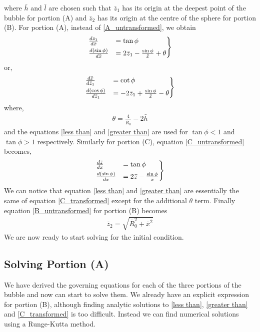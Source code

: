 where $\bar{h}$ and $\bar{l}$ are chosen such that $\bar{z}_1$ has its origin at the deepest point of the bubble for portion (A) and $\bar{z}_2$ has its origin at the centre of the sphere for portion (B). For portion (A), instead of \ref{A_untransformed}, we obtain
\begin{align}\label{less than}
\begin{rcases}   
    \frac{d\bar{z}_1}{d\bar{x}} &= \tan \phi \\
    \frac{d(\sin\phi)}{d\bar{x}} &= 2\bar{z}_1 - \frac{\sin\phi}{\bar{x}} + \theta
\end{rcases} 
\end{align}
or,
\begin{align}\label{greater than}
\begin{rcases}
    \frac{d\bar{x}}{d\bar{z}_1} &= \cot \phi \\
    \frac{d(\cos\phi)}{d\bar{z}_1} &= -2\bar{z}_1 + \frac{\sin\phi}{\bar{x}} - \theta
\end{rcases}
\end{align}
where,
\begin{align}
    \theta = \frac{4}{\bar{R}_0} - 2\bar{h}
\end{align}
and the equations \ref{less than} and \ref{greater than} are used for $\tan\phi <1$ and $\tan\phi >1$ respectively. Similarly for portion (C), equation \ref{C_untransformed} becomes,
\begin{align}\label{C_transformed}
\begin{rcases}   
    \frac{d\bar{z}}{d\bar{x}} &= \tan \phi \\
    \frac{d(\sin\phi)}{d\bar{x}} &= 2\bar{z} - \frac{\sin\phi}{\bar{x}}
\end{rcases} 
\end{align}
We can notice that equation \ref{less than} and \ref{greater than} are essentially the same of equation \ref{C_transformed} except for the additional $\theta$ term. Finally equation \ref{B_untransformed} for portion (B) becomes
\begin{align}\label{Eq_B}
    \bar{z}_2 = \sqrt{ \bar{R}_0^2+\bar{x}^2}
\end{align}
We are now ready to start solving for the initial condition.

\subsection{Solving Portion (A)}

We have derived the governing equations for each of the three portions of the bubble and now can start to solve them. We already have an explicit expression for portion (B), although finding analytic solutions to \ref{less than}, \ref{greater than} and \ref{C_transformed} is too difficult. Instead we can find numerical solutions using a Runge-Kutta method.

